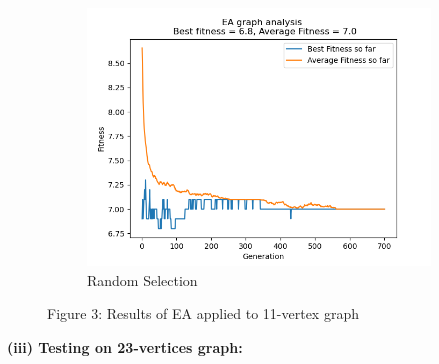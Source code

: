 \documentclass[conference,compsoc]{IEEEtran}
\begin{document}
\begin{figure}\ContinuedFloat
  \centering
  \begin{subfigure}{0.34\textwidth}
    \includegraphics[width=\linewidth]{../Results/_11_Random_Truncation_100_50_700.png}
    \caption{Random Selection}
\end{subfigure}
\caption*{Figure 3: Results of EA applied to 11-vertex graph}
\label{fgigy}
\end{figure}
\newpage
\begin{center}
  \textbf{(iii) Testing on 23-vertices graph:}
\end{center}
\end{document}
